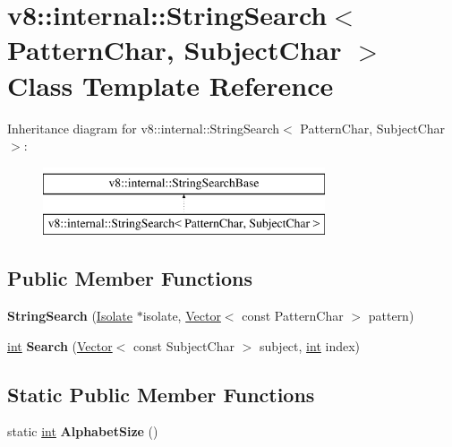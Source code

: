 \hypertarget{classv8_1_1internal_1_1StringSearch}{}\section{v8\+:\+:internal\+:\+:String\+Search$<$ Pattern\+Char, Subject\+Char $>$ Class Template Reference}
\label{classv8_1_1internal_1_1StringSearch}
Inheritance diagram for v8\+:\+:internal\+:\+:String\+Search$<$ Pattern\+Char, Subject\+Char $>$\+:\begin{figure}[H]
\begin{center}
\leavevmode
\includegraphics[height=2.000000cm]{classv8_1_1internal_1_1StringSearch}
\end{center}
\end{figure}
\subsection*{Public Member Functions}
\begin{DoxyCompactItemize}
\item 
\mbox{\label{classv8_1_1internal_1_1StringSearch_ac85cd7d81456c38b54ca0dd30232294e}} 
{\bfseries String\+Search} (\mbox{\hyperlink{classv8_1_1internal_1_1Isolate}{Isolate}} $\ast$isolate, \mbox{\hyperlink{classv8_1_1internal_1_1Vector}{Vector}}$<$ const Pattern\+Char $>$ pattern)
\item 
\mbox{\label{classv8_1_1internal_1_1StringSearch_ad1e65aa301ab863ab3150ca02d6dfdc2}} 
\mbox{\hyperlink{classint}{int}} {\bfseries Search} (\mbox{\hyperlink{classv8_1_1internal_1_1Vector}{Vector}}$<$ const Subject\+Char $>$ subject, \mbox{\hyperlink{classint}{int}} index)
\end{DoxyCompactItemize}
\subsection*{Static Public Member Functions}
\begin{DoxyCompactItemize}
\item 
\mbox{\label{classv8_1_1internal_1_1StringSearch_a2fa4be83d94f58d7804f6db7f8ca484d}} 
static \mbox{\hyperlink{classint}{int}} {\bfseries Alphabet\+Size} ()
\end{DoxyCompactItemize}


